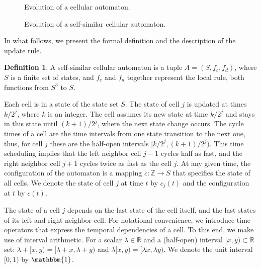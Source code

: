 \documentclass{article}
\theoremstyle{definition}
\newtheorem{defn}{Definition}
\begin{document}
\begin{figure}
\begin{center}
\caption{\label{fig:ca-evo} Evolution of a cellular automaton.}
\end{center}
\end{figure}

\begin{figure}
\begin{center}
\caption{\label{fig:ssca-evo} Evolution of a self-similar cellular automaton.}
\end{center}
\end{figure}

In what follows, we present the formal definition and the description of the update rule.

\begin{defn}
\label{def-ssca}
A self-similar cellular automaton is a tuple $A = (S, f_c, f_d)$, where $S$ is a finite set of states, and
$f_c$ and $f_d$ together represent the local rule, both functions from $S^3$ to $S$.
\end{defn}

Each cell is in a state of the state set $S$.
The state of cell $j$ is updated at times $k / 2^{j}$, where $k$ is an integer.
The cell assumes its new state at time $k / 2^{j}$ and stays in this state until $(k + 1)/2^{j}$, where
the next state change occurs.
The cycle times of a cell are the time intervals from one state transition to the next one, thus,
for cell $j$ these are the half-open intervals $[k/2^j,(k+1)/2^j)$.
This time scheduling implies that the left neighbor cell $j-1$ cycles half as fast, and the right neighbor cell $j+1$ cycles twice as fast as
the cell $j$.
At any given time, the configuration of the automaton is a mapping $c : \mathbb{Z} \rightarrow S$ that specifies the state of all cells.
We denote the state of cell $j$ at time $t$ by $c_j(t)$ and the configuration at $t$ by $c(t)$.

The state of a cell $j$ depends on the last state of the cell itself, and the last states of its left and right neighbor cell.
For notational convenience, we introduce time operators that express the temporal dependencies of a cell.
To this end, we make use of interval arithmetic.
For a scalar $\lambda \in \mathbb{R}$ and a (half-open) interval $[x,y) \subset \mathbb{R}$ set:
$\lambda + [x,y) = [\lambda + x, \lambda + y)$ and $\lambda [x,y) = [\lambda x, \lambda y)$.
We denote the unit interval $[0,1)$ by $\mathbbm{1}$.
\end{document}
